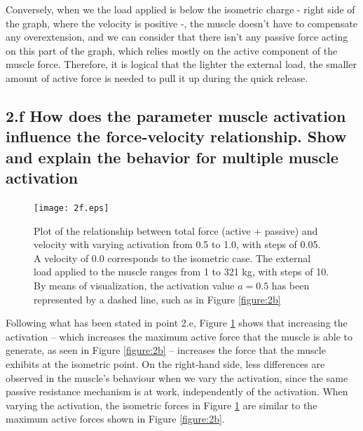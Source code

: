 \documentclass{cmc}
\begin{document}
Conversely, when we the load applied is below the isometric charge - right side of the graph, where the velocity is positive -, the muscle doesn't have to compensate any overextension, and we can consider that there isn't any passive force acting on this part of the graph, which relies mostly on the active component of the muscle force. Therefore, it is logical that the lighter the external load, the smaller amount of active force is needed to pull it up during the quick release. 


\subsection*{2.f How does the parameter muscle activation influence the
  force-velocity relationship.  Show and explain the behavior for
  multiple muscle activation}
  
  
\begin{figure}[H]
\centering
\texttt{[image: 2f.eps]}
\caption{Plot of the relationship between total force (active + passive) and velocity with varying activation from 0.5 to 1.0, with steps of 0.05. A velocity of 0.0 corresponds to the isometric case. The external load applied to the muscle ranges from 1 to 321 kg, with steps of 10. By means of visualization, the activation value $a=0.5$ has been represented by a dashed line, such as in Figure \ref{figure:2b}}
\label{figure:2df}
\end{figure}

Following what has been stated in point 2.e, Figure \ref{figure:2df} shows that increasing the activation -- which increases the maximum active force that the muscle is able to generate, as seen in Figure \ref{figure:2b} -- increases the force that the muscle exhibits at the isometric point. On the right-hand side, less differences are observed in the muscle's behaviour when we vary the activation, since the same passive resistance mechanism is at work, independently of the activation.
When varying the activation, the isometric forces in Figure \ref{figure:2df} are similar to the maximum active forces shown in Figure \ref{figure:2b}.
\end{document}
